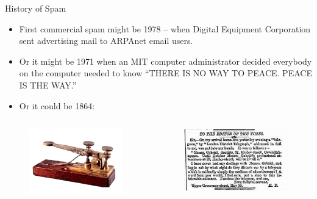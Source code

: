 \documentclass[nobackground,dvipsnames,table,aspectratio=169]{beamer}
\begin{document}
\begin{frame}{History of Spam}
    \begin{itemize}
        \item First commercial spam might be 1978  -- when Digital Equipment Corporation sent advertising mail to ARPAnet email users.
        \item Or it might be 1971 when an MIT computer administrator decided everybody on the computer needed to know “THERE IS NO WAY TO PEACE. PEACE IS THE WAY.”
        \item Or it could be 1864: 
    \end{itemize}
    \begin{columns}
            \begin{figure}
                \centering
                \includegraphics[width=\textwidth]{telegraph}
            \end{figure}
            \begin{figure}
                \centering
                \includegraphics[width=\textwidth]{telegram-spam}
            \end{figure}
    \end{columns}
\end{frame}
\end{document}
